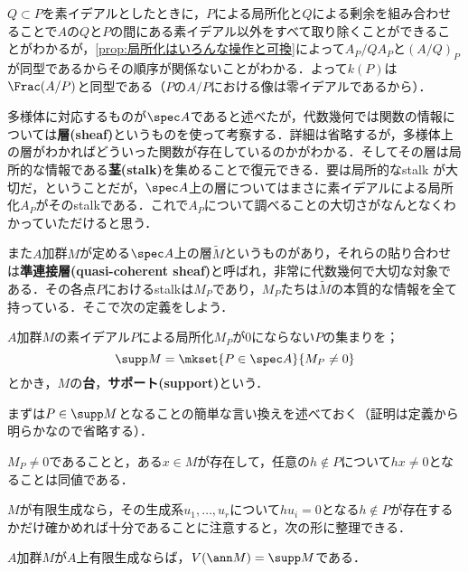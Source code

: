 $Q\subset P$を素イデアルとしたときに，$P$による局所化と$Q$による剰余を組み合わせることで$A$の$Q$と$P$の間にある素イデアル以外をすべて取り除くことができることがわかるが，\ref{prop:局所化はいろんな操作と可換}によって$A_P/QA_P$と$(A/Q)_P$が同型であるからその順序が関係ないことがわかる．よって$k(P)$は$\Frac (A/P)$と同型である（$P$の$A/P$における像は零イデアルであるから）．

\begin{tightcurve}
	多様体に対応するものが$\spec A$であると述べたが，代数幾何では関数の情報については\textbf{層(sheaf)}というものを使って考察する．詳細は省略するが，多様体上の層がわかればどういった関数が存在しているのかがわかる．そしてその層は局所的な情報である\textbf{茎(stalk)}を集めることで復元できる．要は局所的なstalk が大切だ，ということだが，$\spec A$上の層についてはまさに素イデアルによる局所化$A_P$がそのstalkである．これで$A_P$について調べることの大切さがなんとなくわかっていただけると思う．
	
	また$A$加群$M$が定める$\spec A$上の層$\widetilde{M}$というものがあり，それらの貼り合わせは\textbf{準連接層(quasi-coherent sheaf)}と呼ばれ，非常に代数幾何で大切な対象である．その各点$P$におけるstalkは$M_P$であり，$M_P$たちは$\widetilde{M}$の本質的な情報を全て持っている．そこで次の定義をしよう．
\end{tightcurve}

\begin{defi}[台，サポート]\label{defi:support}
	$A$加群$M$の素イデアル$P$による局所化$M_P$が0にならない$P$の集まりを；
	\[\supp M=\mkset{ P\in\spec A}{M_ P\neq 0}\]
	とかき，$M$の\textbf{台}，\textbf{サポート(support)}という．
\end{defi}

まずは$P\in\supp M$となることの簡単な言い換えを述べておく（証明は定義から明らかなので省略する）．

\begin{lem}\label{lem:M_p=0との同値条件}
	$M_P\neq0$であることと，ある$x\in M$が存在して，任意の$h\not\in P$について$hx\neq 0$となることは同値である．
\end{lem}

$M$が有限生成なら，その生成系$u_1,\dots,u_r$について$hu_i=0$となる$h\not\in P$が存在するかだけ確かめれば十分であることに注意すると，次の形に整理できる．

\begin{prop}\label{prop:Zariskiの閉集合とsupp}
	$A$加群$M$が$A$上有限生成ならば，$V(\ann M)=\supp M$である．
\end{prop}

